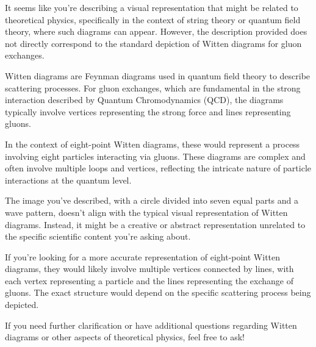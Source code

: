 It seems like you're describing a visual representation that might be related to theoretical physics, specifically in the context of string theory or quantum field theory, where such diagrams can appear. However, the description provided does not directly correspond to the standard depiction of Witten diagrams for gluon exchanges.

Witten diagrams are Feynman diagrams used in quantum field theory to describe scattering processes. For gluon exchanges, which are fundamental in the strong interaction described by Quantum Chromodynamics (QCD), the diagrams typically involve vertices representing the strong force and lines representing gluons.

In the context of eight-point Witten diagrams, these would represent a process involving eight particles interacting via gluons. These diagrams are complex and often involve multiple loops and vertices, reflecting the intricate nature of particle interactions at the quantum level.

The image you've described, with a circle divided into seven equal parts and a wave pattern, doesn't align with the typical visual representation of Witten diagrams. Instead, it might be a creative or abstract representation unrelated to the specific scientific content you're asking about.

If you're looking for a more accurate representation of eight-point Witten diagrams, they would likely involve multiple vertices connected by lines, with each vertex representing a particle and the lines representing the exchange of gluons. The exact structure would depend on the specific scattering process being depicted.

If you need further clarification or have additional questions regarding Witten diagrams or other aspects of theoretical physics, feel free to ask!